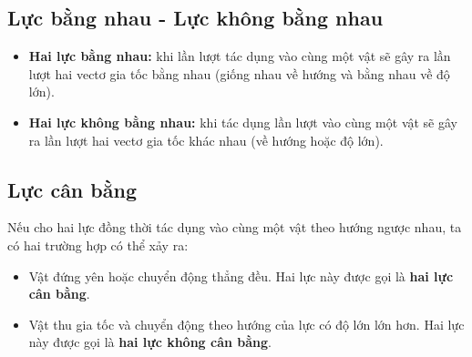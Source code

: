 \subsection{Lực bằng nhau - Lực không bằng nhau}
\begin{itemize}
	\item \textbf{Hai lực bằng nhau:} khi lần lượt tác dụng vào cùng một vật sẽ gây ra lần lượt hai vectơ gia tốc bằng nhau (giống nhau về hướng và bằng nhau về độ lớn).
	\item \textbf{Hai lực không bằng nhau:} khi tác dụng lần lượt vào cùng một vật sẽ gây ra lần lượt hai vectơ gia tốc khác nhau (về hướng hoặc độ lớn).
\end{itemize}
\subsection{Lực cân bằng}
Nếu cho hai lực đồng thời tác dụng vào cùng một vật theo hướng ngược nhau, ta có hai trường hợp có thể xảy ra:
\begin{itemize}
	\item Vật đứng yên hoặc chuyển động thẳng đều. Hai lực này được gọi là \textbf{hai lực cân bằng}.
	\item Vật thu gia tốc và chuyển động theo hướng của lực có độ lớn lớn hơn. Hai lực này được gọi là \textbf{hai lực không cân bằng}.
\end{itemize}
